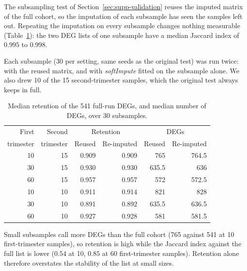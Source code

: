 \documentclass[11pt,a4paper]{article}
\begin{document}
The subsampling test of Section~\ref{sec:supp-validation} reuses
the imputed matrix of the full cohort, so the imputation of each
subsample has seen the samples left out. Repeating the imputation
on every subsample changes nothing measurable
(Table~\ref{tab:supp-reimpute}): the two DEG lists of one
subsample have a median Jaccard index of $0.995$ to $0.998$.

Each subsample (30 per setting, same seeds as the original test)
was run twice: with the reused matrix, and with
\textit{softImpute} fitted on the subsample alone. We also drew
10 of the 15 second-trimester samples, which the original test
always keeps in full.

\begin{table}[htbp]
\centering
\caption{Median retention of the 541 full-run DEGs, and median
  number of DEGs, over 30 subsamples.}
\label{tab:supp-reimpute}
\begin{tabular}{rrrrrr}
\toprule
First & Second & \multicolumn{2}{c}{Retention} & \multicolumn{2}{c}{DEGs} \\
trimester & trimester & Reused & Re-imputed & Reused & Re-imputed \\
\midrule
10 & 15 & 0.909 & 0.909 & 765 & 764.5 \\
30 & 15 & 0.930 & 0.930 & 635.5 & 636 \\
60 & 15 & 0.957 & 0.957 & 572 & 572.5 \\
10 & 10 & 0.911 & 0.914 & 821 & 828 \\
30 & 10 & 0.891 & 0.892 & 635.5 & 636.5 \\
60 & 10 & 0.927 & 0.928 & 581 & 581.5 \\
\bottomrule
\end{tabular}
\end{table}

Small subsamples call more DEGs than the full cohort (765 against
541 at 10 first-trimester samples), so retention is high while the
Jaccard index against the full list is lower ($0.54$ at 10, $0.85$
at 60 first-trimester samples). Retention alone therefore
overstates the stability of the list at small sizes.
\end{document}
